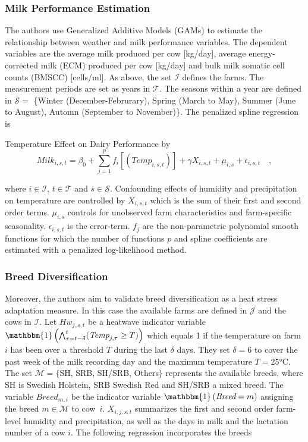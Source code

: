\subsubsection*{Milk Performance Estimation}
The authors use Generalized Additive Models (GAMs) to estimate the relationship between weather and milk performance variables. The dependent variables are the average milk produced per cow [kg/day], average energy-corrected milk (ECM) produced per cow [kg/day] and bulk milk somatic cell counts (BMSCC) [cells/ml]. As above, the set $\mathcal{I}$ defines the farms. The measurement periods are set as years in $\mathcal{T}$. The seasons within a year are defined in $\mathcal{S} =$ \{Winter (December-Februrary), Spring (March to May), Summer (June to August), Automn (September to November)\}. The penalized spline regression is

\begin{defi} Temperature Effect on Dairy Performance by \cite{ahmed_temperature_2022}
\begin{equation}\label{method:ahmed_1}
    \textit{Milk}_{i,s,t} = \beta_0 + \sum_{j=1}^{p} f_i[(\textit{Temp}_{i,s,t})] + \gamma X_{i,s,t} + \mu_{i,s} + \epsilon_{i,s,t}\quad,
\end{equation} 
\end{defi}

where $i \in \mathcal{I}$,  $t \in \mathcal{T}$ and $s \in \mathcal{S}$. Confounding effects of humidity and precipitation on temperature are controlled by $X_{i,s,t}$ which is the sum of their first and second order terms. $\mu_{i,s}$ controls for unobserved farm characteristics and farm-specific seasonality. $\epsilon_{i,s,t}$ is the error-term. $f_j$ are the non-parametric polynomial smooth functions for which the number of functions $p$ and spline coefficients are estimated with a penalized log-likelihood method.

\subsubsection*{Breed Diversification}
Moreover, the authors aim to validate breed diversification as a heat stress adaptation measure. In this case the available farms are defined in $\mathcal{J}$ and the cows in $\mathcal{I}$. Let $\textit{Hw}_{j,s,t}$ be a heatwave indicator variable $\mathbbm{1}\left (\bigwedge_{\tau=t-\delta}^{t} (\textit{Temp}_{j,\tau} \geq T)\right )$ which equals 1 if the temperature on farm $i$ has been over a threshold $T$ during the last $\delta$ days. They set $\delta=6$ to cover the past week of the milk recording day and the maximum temperature $T=25$°C. The set $\mathcal{M}=\{$SH, SRB, SH/SRB, Others$\}$ represents the available breeds, where SH is Swedish Holstein, SRB Swedish Red and SH/SRB a mixed breed. The variable $\textit{Breed}_{m,i}$ be the indicator variable $\mathbbm{1}\left (\textit{Breed} = m \right )$ assigning the breed $m \in \mathcal{M}$ to cow~$i$. $X_{i,j,s,t}$ summarizes the first and second order farm-level humidity and precipitation, as well as the days in milk and the lactation number of a cow $i$. The following regression incorporates the breeds

